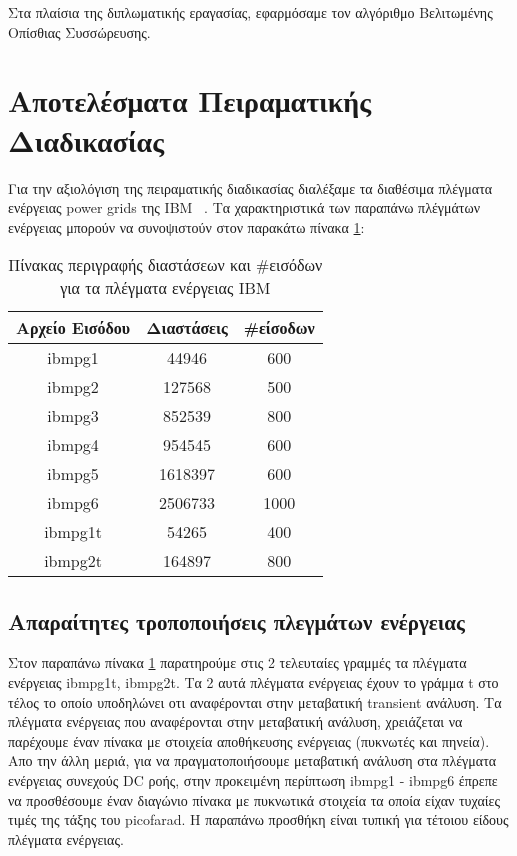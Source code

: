 Στα πλαίσια της διπλωματικής εραγασίας, εφαρμόσαμε τον αλγόριθμο Βελιτωμένης Οπίσθιας Συσσώρευσης.

\section{Αποτελέσματα Πειραματικής Διαδικασίας}

Για την αξιολόγιση της πειραματικής διαδικασίας διαλέξαμε τα διαθέσιμα πλέγματα ενέργειας \textlatin{power grids} της \textlatin{IBM} ~\cite{nassif2008power}. Τα χαρακτηριστικά των παραπάνω πλέγμάτων ενέργειας μπορούν να συνοψιστούν στον παρακάτω πίνακα \ref{table:1}:

\begin{table}[h!]
\centering
 \begin{tabular}{||c | c | c||} 
 \hline
 Αρχείο Εισόδου & Διαστάσεις & \textlatin{\#}είσοδων \\ [0.5ex] 
 \hline\hline
 \textlatin{ibmpg1} & 44946 & 600 \\ 
 \hline
 \textlatin{ibmpg2} & 127568 & 500 \\
 \hline
 \textlatin{ibmpg3} & 852539 & 800 \\
 \hline
 \textlatin{ibmpg4} & 954545 & 600 \\
 \hline
 \textlatin{ibmpg5} & 1618397 & 600 \\
 \hline
 \textlatin{ibmpg6} & 2506733 & 1000 \\
 \hline
 \textlatin{ibmpg1t} & 54265 & 400 \\
 \hline
 \textlatin{ibmpg2t} & 164897 & 800 \\
 \hline
\end{tabular}
\caption{Πίνακας περιγραφής διαστάσεων και \textlatin{\#}εισόδων για τα πλέγματα ενέργειας \textlatin{IBM}}
\label{table:1}
\end{table}

\subsection{Απαραίτητες τροποποιήσεις πλεγμάτων ενέργειας}
Στον παραπάνω πίνακα \ref{table:1} παρατηρούμε στις 2 τελευταίες γραμμές τα πλέγματα ενέργειας \textlatin{ibmpg1t, ibmpg2t}. Τα 2 αυτά πλέγματα ενέργειας έχουν το γράμμα \textlatin{t} στο τέλος το οποίο υποδηλώνει οτι αναφέρονται στην μεταβατική \textlatin{transient} ανάλυση. Τα πλέγματα ενέργειας που αναφέρονται στην μεταβατική ανάλυση, χρειάζεται να παρέχουμε έναν πίνακα με στοιχεία αποθήκευσης ενέργειας (πυκνωτές και πηνεία). Απο την άλλη μεριά, για να πραγματοποιήσουμε μεταβατική ανάλυση στα πλέγματα ενέργειας συνεχούς \textlatin{DC} ροής, στην προκειμένη περίπτωση \textlatin{ibmpg1 - ibmpg6} έπρεπε να προσθέσουμε έναν διαγώνιο πίνακα με πυκνωτικά στοιχεία τα οποία είχαν τυχαίες τιμές της τάξης του \textlatin{picofarad}. Η παραπάνω προσθήκη είναι τυπική για τέτοιου είδους πλέγματα ενέργειας.



